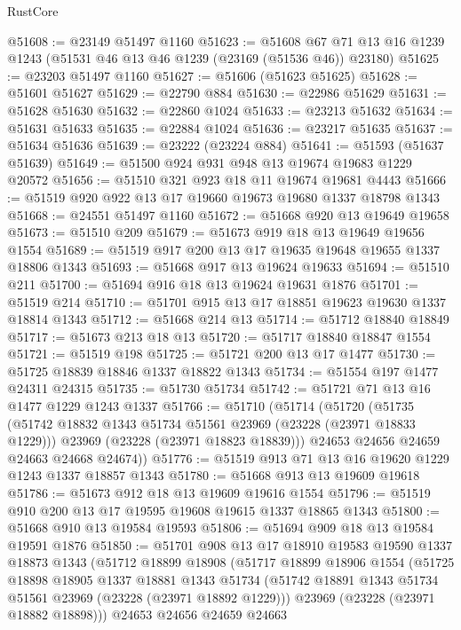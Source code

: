 \begin{lexlean}{RustCore}
\begin{coremodule}
@51608 := @23149 @51497 @1160
@51623 := @51608 @67 @71 @13 @16 @1239 @1243 (@51531 @46 @13 @46 @1239 (@23169 (@51536 @46)) @23180)
@51625 := @23203 @51497 @1160
@51627 := @51606 (@51623 @51625)
@51628 := @51601 @51627
@51629 := @22790 @884
@51630 := @22986 @51629
@51631 := @51628 @51630
@51632 := @22860 @1024
@51633 := @23213 @51632
@51634 := @51631 @51633
@51635 := @22884 @1024
@51636 := @23217 @51635
@51637 := @51634 @51636
@51639 := @23222 (@23224 @884)
@51641 := @51593 (@51637 @51639)
@51649 := @51500 @924 @931 @948 @13 @19674 @19683 @1229 @20572
@51656 := @51510 @321 @923 @18 @11 @19674 @19681 @4443
@51666 := @51519 @920 @922 @13 @17 @19660 @19673 @19680 @1337 @18798 @1343
@51668 := @24551 @51497 @1160
@51672 := @51668 @920 @13 @19649 @19658
@51673 := @51510 @209
@51679 := @51673 @919 @18 @13 @19649 @19656 @1554
@51689 := @51519 @917 @200 @13 @17 @19635 @19648 @19655 @1337 @18806 @1343
@51693 := @51668 @917 @13 @19624 @19633
@51694 := @51510 @211
@51700 := @51694 @916 @18 @13 @19624 @19631 @1876
@51701 := @51519 @214
@51710 := @51701 @915 @13 @17 @18851 @19623 @19630 @1337 @18814 @1343
@51712 := @51668 @214 @13
@51714 := @51712 @18840 @18849
@51717 := @51673 @213 @18 @13
@51720 := @51717 @18840 @18847 @1554
@51721 := @51519 @198
@51725 := @51721 @200 @13 @17 @1477
@51730 := @51725 @18839 @18846 @1337 @18822 @1343
@51734 := @51554 @197 @1477 @24311 @24315
@51735 := @51730 @51734
@51742 := @51721 @71 @13 @16 @1477 @1229 @1243 @1337
@51766 := @51710
    (@51714
      (@51720
        (@51735
          (@51742 @18832 @1343 @51734 @51561 @23969 (@23228 (@23971 @18833 @1229)))
          @23969
          (@23228 (@23971 @18823 @18839)))
        @24653
        @24656
        @24659
        @24663
        @24668
        @24674))
@51776 := @51519 @913 @71 @13 @16 @19620 @1229 @1243 @1337 @18857 @1343
@51780 := @51668 @913 @13 @19609 @19618
@51786 := @51673 @912 @18 @13 @19609 @19616 @1554
@51796 := @51519 @910 @200 @13 @17 @19595 @19608 @19615 @1337 @18865 @1343
@51800 := @51668 @910 @13 @19584 @19593
@51806 := @51694 @909 @18 @13 @19584 @19591 @1876
@51850 := @51701
    @908
    @13
    @17
    @18910
    @19583
    @19590
    @1337
    @18873
    @1343
    (@51712
      @18899
      @18908
      (@51717
        @18899
        @18906
        @1554
        (@51725
          @18898
          @18905
          @1337
          @18881
          @1343
          @51734
          (@51742 @18891 @1343 @51734 @51561 @23969 (@23228 (@23971 @18892 @1229)))
          @23969
          (@23228 (@23971 @18882 @18898)))
        @24653
        @24656
        @24659
        @24663

\end{coremodule}
\end{lexlean}
